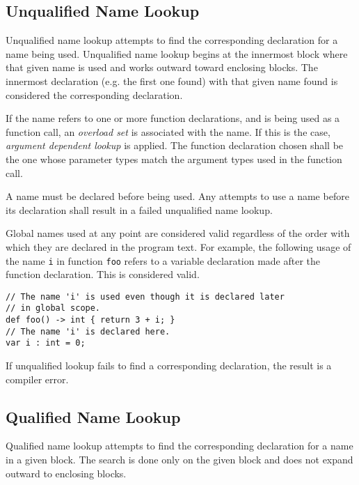 \subsection{Unqualified Name Lookup} \label{unqlfd_lookup}

Unqualified name lookup attempts to find the corresponding declaration for a name being used. Unqualified name lookup begins at the innermost block where that given name is used and works outward toward enclosing blocks. The innermost declaration (e.g. the first one found) with that given name found is considered the corresponding declaration. 

If the name refers to one or more function declarations, and is being used as a function call, an \textit{overload set} is associated with the name. If this is the case, \textit{argument dependent lookup} is applied. The function declaration chosen shall be the one whose parameter types match the argument types used in the function call.

A name must be declared before being used. Any attempts to use a name before its declaration shall result in a failed unqualified name lookup.

Global names used at any point are considered valid regardless of the order with which they are declared in the program text. For example, the following usage of the name \texttt{i} in function \texttt{foo} refers to a variable declaration made after the function declaration. This is considered valid.

\noindent\begin{minipage}{\linewidth}

\begin{lstlisting}
// The name 'i' is used even though it is declared later
// in global scope.
def foo() -> int { return 3 + i; }
// The name 'i' is declared here.
var i : int = 0;
\end{lstlisting}

\end{minipage}

If unqualified lookup fails to find a corresponding declaration, the result is a compiler error.

\subsection{Qualified Name Lookup}

Qualified name lookup attempts to find the corresponding declaration for a name in a given block. The search is done only on the given block and does not expand outward to enclosing blocks.

